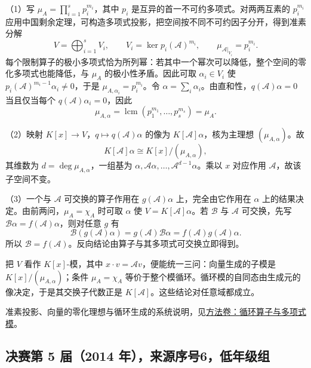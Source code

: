 \documentclass[UTF8,12pt,a4paper,fontset=fandol]{ctexart}
\begin{document}
\begin{solve}

（1）写 $\mu_A=\prod_{i=1}^s p_i^{m_i}$，其中 $p_i$ 是互异的首一不可约多项式。对两两互素的 $p_i^{m_i}$ 应用中国剩余定理，可构造多项式投影，把空间按不同不可约因子分开，得到准素分解
\[
V=\bigoplus_{i=1}^s V_i,\qquad
V_i=\ker p_i(\mathcal A)^{m_i},\qquad
\mu_{\mathcal A|_{V_i}}=p_i^{m_i}.
\]
每个限制算子的极小多项式恰为所列幂：若其中一个幂次可以降低，整个空间的零化多项式也能降低，与 $\mu_A$ 的极小性矛盾。因此可取 $\alpha_i\in V_i$ 使 $p_i(\mathcal A)^{m_i-1}\alpha_i\neq0$，于是 $\mu_{A,\alpha_i}=p_i^{m_i}$。令 $\alpha=\sum_i\alpha_i$。由直和性，$q(\mathcal A)\alpha=0$ 当且仅当每个 $q(\mathcal A)\alpha_i=0$，因此
\[
\mu_{A,\alpha}=\operatorname{lcm}(p_1^{m_1},\ldots,p_s^{m_s})=\mu_A.
\]

（2）映射 $K[x]\to V$，$q\mapsto q(\mathcal A)\alpha$ 的像为 $K[\mathcal A]\alpha$，核为主理想 $(\mu_{A,\alpha})$。故
\[
K[\mathcal A]\alpha\cong K[x]/(\mu_{A,\alpha}),
\]
其维数为 $d=\deg\mu_{A,\alpha}$，一组基为 $\alpha,\mathcal A\alpha,\ldots,\mathcal A^{d-1}\alpha$。乘以 $x$ 对应作用 $\mathcal A$，故该子空间不变。

（3）一个与 $\mathcal A$ 可交换的算子作用在 $g(\mathcal A)\alpha$ 上，完全由它作用在 $\alpha$ 上的结果决定。由前两问，$\mu_A=\chi_A$ 时可取 $\alpha$ 使 $V=K[\mathcal A]\alpha$。若 $\mathcal B$ 与 $\mathcal A$ 可交换，先写 $\mathcal B\alpha=f(\mathcal A)\alpha$，则对任意 $g$ 有
\[
\mathcal B(g(\mathcal A)\alpha)
=g(\mathcal A)\mathcal B\alpha
=f(\mathcal A)g(\mathcal A)\alpha.
\]
所以 $\mathcal B=f(\mathcal A)$。反向结论由算子与其多项式可交换立即得到。

\end{solve}

\begin{remark}[方法与条件]

把 $V$ 看作 $K[x]$-模，其中 $x\cdot v=\mathcal Av$，便能统一三问：向量生成的子模是 $K[x]/(\mu_{A,\alpha})$；条件 $\mu_A=\chi_A$ 等价于整个模循环。循环模的自同态由生成元的像决定，于是其交换子代数正是 $K[\mathcal A]$。这些结论对任意域都成立。

准素投影、向量的零化理想与循环生成的系统说明，见\hyperref[app:linear-cyclic]{方法卷：循环算子与多项式模}。

\end{remark}

\subsection{决赛第 5 届（2014 年），来源序号6，低年级组}\label{ans:fin05-lo:3}\label{pr:fin05-lo:3}
\end{document}

